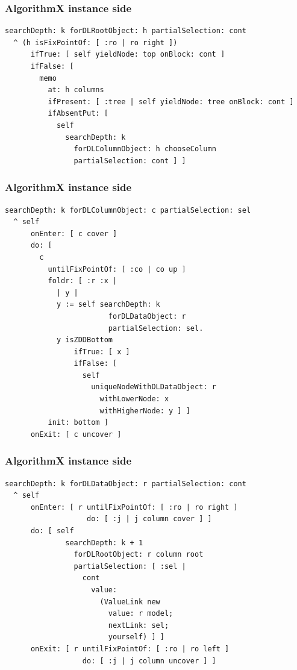 \documentclass[10pt]{beamer}
\begin{document}
\begin{frame}[fragile]
\frametitle{AlgorithmX instance side}
\begin{verbatim}
searchDepth: k forDLRootObject: h partialSelection: cont
  ^ (h isFixPointOf: [ :ro | ro right ])
      ifTrue: [ self yieldNode: top onBlock: cont ]
      ifFalse: [ 
        memo
          at: h columns
          ifPresent: [ :tree | self yieldNode: tree onBlock: cont ]
          ifAbsentPut: [ 
            self
              searchDepth: k
                forDLColumnObject: h chooseColumn
                partialSelection: cont ] ]
\end{verbatim}
\end{frame}

\begin{frame}[fragile]
\frametitle{AlgorithmX instance side}
\begin{verbatim}
searchDepth: k forDLColumnObject: c partialSelection: sel
  ^ self
      onEnter: [ c cover ]
      do: [ 
        c
          untilFixPointOf: [ :co | co up ]
          foldr: [ :r :x | 
            | y |
            y := self searchDepth: k 
                        forDLDataObject: r 
                        partialSelection: sel.
            y isZDDBottom
                ifTrue: [ x ]
                ifFalse: [ 
                  self
                    uniqueNodeWithDLDataObject: r
                      withLowerNode: x
                      withHigherNode: y ] ]
          init: bottom ]
      onExit: [ c uncover ]
\end{verbatim}
\end{frame}

\begin{frame}[fragile]
\frametitle{AlgorithmX instance side}
\begin{verbatim}
searchDepth: k forDLDataObject: r partialSelection: cont
  ^ self
      onEnter: [ r untilFixPointOf: [ :ro | ro right ] 
                   do: [ :j | j column cover ] ]
      do: [ self
              searchDepth: k + 1
                forDLRootObject: r column root
                partialSelection: [ :sel | 
                  cont
                    value:
                      (ValueLink new
                        value: r model;
                        nextLink: sel;
                        yourself) ] ]
      onExit: [ r untilFixPointOf: [ :ro | ro left ] 
                  do: [ :j | j column uncover ] ]
\end{verbatim}
\end{frame}
\end{document}
